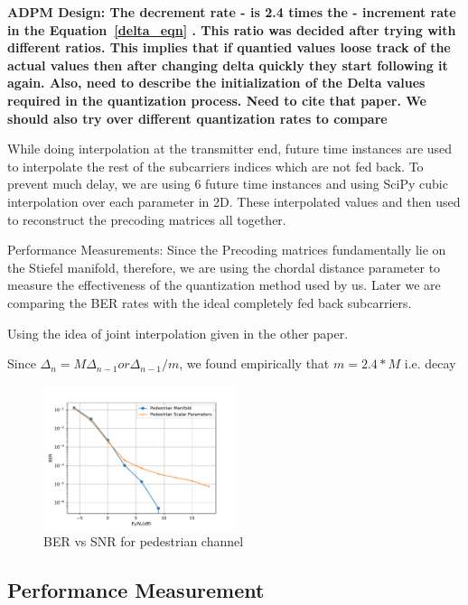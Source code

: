 \documentclass[conference]{IEEEtran}
\begin{document}
\bf{ADPM Design}: The decrement rate - \bm is 2.4 times the \bM - increment rate in the Equation~\ref{delta_eqn} . This ratio was decided after trying with different ratios. This implies that if quantied values loose track of the actual values then after changing delta quickly they start following it again.
Also, need to describe the initialization of the Delta values required in the quantization process. Need to cite that paper. We should also try over different quantization rates to compare

While doing interpolation at the transmitter end, future time instances are used to interpolate the rest of the subcarriers indices which are not fed back. To prevent much delay, we are using 6 future time instances and using SciPy cubic interpolation over each parameter in 2D. These interpolated values and then used to reconstruct the precoding matrices all together.

Performance Measurements:
Since the Precoding matrices fundamentally lie on the Stiefel manifold, therefore, we are using the chordal distance parameter to measure the effectiveness of the quantization method used by us. Later we are comparing the BER rates with the ideal completely fed back subcarriers.

Using the idea of joint interpolation given in the other paper.

Since $\Delta_{n} = M\Delta_{n-1} or \Delta_{n-1}/m $, we found empirically that $m=2.4*M$ i.e. decay

\begin{figure}
\includegraphics[width=0.5\textwidth]{images/pedestrian.pdf}
\caption{BER vs SNR for pedestrian channel}
\label{ber_overview}
\vspace{-5pt}
\end{figure}

\subsection{Performance Measurement}
\end{document}
